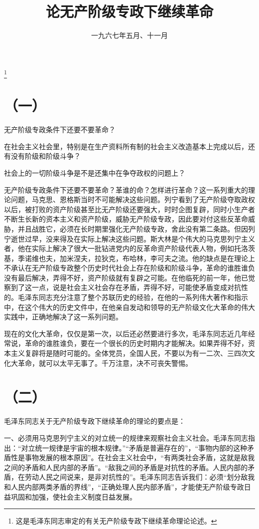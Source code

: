 
\title{论无产阶级专政下继续革命}
\date{一九六七年五月、十一月}
\thanks{这是毛泽东同志审定的有关无产阶级专政下继续革命理论论述。}
\maketitle


\section*{（一）}

无产阶级专政条件下还要不要革命？

在社会主义社会里，特别是在生产资料所有制的社会主义改造基本上完成以后，还有没有阶级和阶级斗争？

社会上的一切阶级斗争是不是还集中在争夺政权的问题上？

无产阶级专政条件下还要不要革命？革谁的命？怎样进行革命？这一系列重大的理论问题，马克思、恩格斯当时不可能解决这些问题。列宁看到了无产阶级夺取政权以后，被打败的资产阶级甚至比无产阶级还要强大，时时企图复辟，同时小生产者不断生长新的资本主义和资产阶级，威胁无产阶级专政，因此要对付这些反革命威胁，并且战胜它，必须在长时期里强化无产阶级专政，舍此没有第二条路。但因列宁逝世过早，没来得及在实际上解决这些问题。斯大林是个伟大的马克思列宁主义者，他在实际上解决了很大一批钻进党内的反革命资产阶级代表人物，例如托洛茨基，季诺维也夫，加米涅夫，拉狄克，布哈林，李可夫之流。他的缺点是在理论上不承认在无产阶级专政整个历史时代社会上存在阶级和阶级斗争，革命的谁胜谁负没有最后解决，弄得不好，资产阶级就有复辟之可能。在他临死的前一年，他已觉察到了这一点，说是社会主义社会存在矛盾，弄得不好，可能使矛盾变成对抗性的。毛泽东同志充分注意了整个苏联历史的经验，在他的一系列伟大著作和指示中，在这个伟大的历史文件中，在他亲自发动和领导的无产阶级文化大革命的伟大实践中，正确地解决了这一系列问题。

现在的文化大革命，仅仅是第一次，以后还必然要进行多次，毛泽东同志近几年经常说，革命的谁胜谁负，要在一个很长的历史时期内才能解决。如果弄得不好，资本主义复辟将是随时可能的。全体党员，全国人民，不要以为有一二次、三四次文化大革命，就可以太平无事了。千万注意，决不可丧失警惕。

\section*{（二）}

毛泽东同志关于无产阶级专政下继续革命的理论的要点是：

一、必须用马克思列宁主义的对立统一的规律来观察社会主义社会。毛泽东同志指出：“对立统一规律是宇宙的根本规律。”“矛盾是普遍存在的”，“事物内部的这种矛盾性是事物发展的根本原因”。在社会主义社会中，“有两类社会矛盾，这就是敌我之间的矛盾和人民内部的矛盾”。“敌我之间的矛盾是对抗性的矛盾。人民内部的矛盾，在劳动人民之间说来，是非对抗性的”。毛泽东同志告诉我们：必须“划分敌我和人民内部两类矛盾的界线”，“正确处理人民内部矛盾”，才能使无产阶级专政日益巩固和加强，使社会主义制度日益发展。

